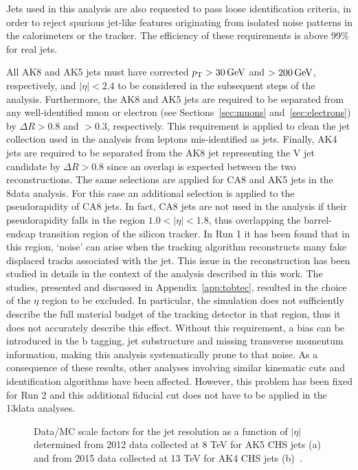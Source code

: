 Jets used in this analysis are also requested to pass loose identification criteria, in order to reject spurious jet-like features originating from isolated noise patterns in the calorimeters or the tracker. The efficiency of these requirements is above 99\% for real jets. 

All AK8 and AK5 jets must have corrected $p_{\mathrm{T}} > 30\,\text{Ge\hspace{-.08em}V}$ and $> 200\,\text{Ge\hspace{-.08em}V}$, respectively, and $|\eta| < 2.4$ to be considered in the subsequent steps of the analysis.
Furthermore, the AK8 and AK5 jets are required to be separated from any well-identified muon or electron (see Sections~\ref{sec:muons} and~\ref{sec:electrons}) by $\Delta R > 0.8$ and $> 0.3$, respectively. This requirement is applied to clean the jet collection used in the analysis from leptons mis-identified as jets. Finally, AK4 jets are required to be separated from the AK8 jet representing the V jet candidate by $\Delta R > 0.8$ since an overlap is expected between the two reconstructions. The same selections are applied for CA8 and AK5 jets in the 8\TeV data analysis. For this case an additional selection is applied to the pseudorapidity of CA8 jets.
In fact, CA8 jets are not used in the analysis if their pseudorapidity falls in the region $1.0 < |\eta| < 1.8$, thus overlapping the barrel-endcap transition region of the silicon tracker.
In Run 1 it has been found that in this region, `noise' can arise when the tracking algorithm reconstructs many fake displaced tracks associated with the jet.
This issue in the reconstruction has been studied in details in the context of the analysis described in this work. The studies, presented and discussed in Appendix~\ref{app:tobtec}, resulted in the choice of the $\eta$ region to be excluded.
In particular, the simulation does not sufficiently describe the full material budget of the tracking detector in that region, thus it does not accurately describe this effect.
Without this requirement, a bias can be introduced in the b tagging, jet substructure and missing transverse momentum information, making this analysis systematically prone to that noise.
As a consequence of these results, other analyses involving similar kinematic cuts and identification algorithms have been affected.
However, this problem has been fixed for Run 2 and this additional fiducial cut does not have to be applied in the 13\TeV data analyses.

\begin{figure}[!htb]
\begin{center}
\end{center} 
\caption{Data/MC scale factors for the jet \pt resolution as a function of $|\eta|$ determined from 2012 data collected at 8 TeV for AK5 CHS jets (a) and from 2015 data collected at 13 TeV for AK4 CHS jets (b)~\cite{Khachatryan:2016kdb,CMS-DP-2016-020}.}
\label{fig:resolcorr813TeV}
\end{figure}

